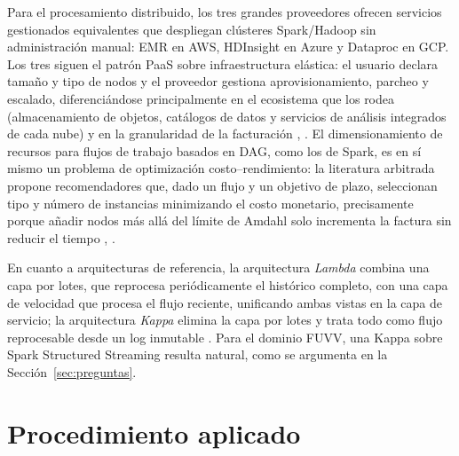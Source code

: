 \documentclass[10pt,journal]{IEEEtran}
\begin{document}
Para el procesamiento distribuido, los tres grandes proveedores ofrecen
servicios gestionados equivalentes que despliegan cl\'usteres Spark/Hadoop sin
administraci\'on manual: EMR en AWS, HDInsight en Azure y Dataproc en GCP. Los
tres siguen el patr\'on PaaS sobre infraestructura el\'astica: el usuario
declara tama\~no y tipo de nodos y el proveedor gestiona aprovisionamiento,
parcheo y escalado, diferenci\'andose principalmente en el ecosistema que los
rodea (almacenamiento de objetos, cat\'alogos de datos y servicios de an\'alisis
integrados de cada nube) y en la granularidad de la facturaci\'on
\cite{mell2011}, \cite{burns2024}. El dimensionamiento de
recursos para flujos de trabajo basados en DAG, como los de Spark, es en s\'i
mismo un problema de optimizaci\'on costo--rendimiento: la literatura arbitrada
propone recomendadores que, dado un flujo y un objetivo de plazo, seleccionan
tipo y n\'umero de instancias minimizando el costo monetario, precisamente
porque a\~nadir nodos m\'as all\'a del l\'imite de Amdahl solo incrementa la
factura sin reducir el tiempo \cite{asemanmanzar2023}, \cite{amdahl1967}.

En cuanto a arquitecturas de referencia, la arquitectura \emph{Lambda} combina
una capa por lotes, que reprocesa peri\'odicamente el hist\'orico completo, con
una capa de velocidad que procesa el flujo reciente, unificando ambas vistas en
la capa de servicio; la arquitectura \emph{Kappa} elimina la capa por lotes y
trata todo como flujo reprocesable desde un log inmutable
\cite{armbrust2018}. Para el dominio FUVV, una Kappa sobre Spark Structured
Streaming resulta natural, como se argumenta en la
Secci\'on~\ref{sec:preguntas}.

\section{Procedimiento aplicado}
\label{sec:procedimiento}
\end{document}
